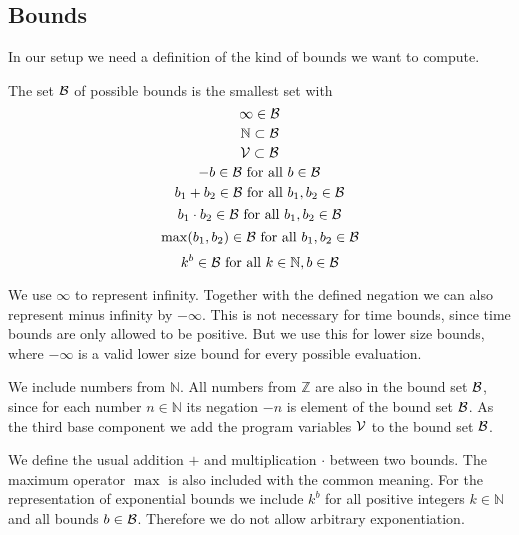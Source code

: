\subsection{Bounds}

In our setup we need a definition of the kind of bounds we want to compute.

\begin{definition}
  The set $\mathcal{B}$ of possible bounds is the smallest set with
  \[ \infty \in \mathcal{B} \]
  \[ \mathbb{N} \subset \mathcal{B} \] 
  \[ \mathcal{V} \subset \mathcal{B} \] 
  \[ -b \in \mathcal{B} \text{ for all } b \in \mathcal{B} \] 
  \[ b_1 + b_2 \in \mathcal{B} \text{ for all } b_1, b_2 \in \mathcal{B} \] 
  \[ b_1 \cdot b_2 \in \mathcal{B} \text{ for all } b_1, b_2 \in \mathcal{B} \] 
  \[ \max(b_1, b_2) \in \mathcal{B} \text{ for all } b_1, b_2 \in \mathcal{B} \]
  \[ k^b \in \mathcal{B} \text{ for all } k \in \mathbb{N}, b \in \mathcal{B} \]
\end{definition}

We use $\infty$ to represent infinity.
Together with the defined negation we can also represent minus infinity by $-\infty$.
This is not necessary for time bounds, since time bounds are only allowed to be positive.
But we use this for lower size bounds, where $-\infty$ is a valid lower size bound for every possible evaluation.

We include numbers from $\mathbb{N}$.
All numbers from $\mathbb{Z}$ are also in the bound set $\mathcal{B}$, since for each number $n \in \mathbb{N}$ its negation $-n$ is element of the bound set $\mathcal{B}$.
As the third base component we add the program variables $\mathcal{V}$ to the bound set $\mathcal{B}$.

We define the usual addition $+$ and multiplication $\cdot$ between two bounds.
The maximum operator $\max$ is also included with the common meaning.
For the representation of exponential bounds we include $k^b$ for all positive integers $k \in \mathbb{N}$ and all bounds $b \in \mathcal{B}$.
Therefore we do not allow arbitrary exponentiation.

